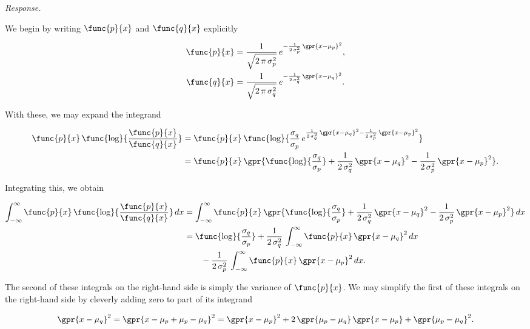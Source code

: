 \textit{Response.}

We begin by writing $\func{p}{x}$ and $\func{q}{x}$ explicitly

\begin{subequations}
	\begin{align}
		\func{p}{x} &= \frac{1}{\sqrt{2\,\pi\,\sigma_p^2}}\,e^{-\frac{1}{2\,\sigma_p^2}\,\gpr{x - \mu_p}^2},\\
		\func{q}{x} &= \frac{1}{\sqrt{2\,\pi\,\sigma_q^2}}\,e^{-\frac{1}{2\,\sigma_q^2}\,\gpr{x - \mu_q}^2}.
	\end{align}
\end{subequations}

With these, we may expand the integrand

\begin{align}
	\func{p}{x}\,\func{\log}{\frac{\func{p}{x}}{\func{q}{x}}} &= \func{p}{x}\,\func{\log}{\frac{\sigma_q}{\sigma_p}\,e^{\frac{1}{2\,\sigma_q^2}\,\gpr{x - \mu_q}^2 - \frac{1}{2\,\sigma_p^2}\,\gpr{x - \mu_p}^2}} \nonumber \\
		&= \func{p}{x}\,\gpr{\func{\log}{\frac{\sigma_q}{\sigma_p}} + \frac{1}{2\,\sigma_q^2}\,\gpr{x - \mu_q}^2 - \frac{1}{2\,\sigma_p^2}\,\gpr{x - \mu_p}^2}.
\end{align}

Integrating this, we obtain

\begin{align}
	\int_{-\infty}^{\infty} \func{p}{x}\,\func{\log}{\frac{\func{p}{x}}{\func{q}{x}}}\,dx &= \int_{-\infty}^{\infty} \func{p}{x}\,\gpr{\func{\log}{\frac{\sigma_q}{\sigma_p}} + \frac{1}{2\,\sigma_q^2}\,\gpr{x - \mu_q}^2 - \frac{1}{2\,\sigma_p^2}\,\gpr{x - \mu_p}^2}\,dx \nonumber \\
		&= \func{\log}{\frac{\sigma_q}{\sigma_p}} + \frac{1}{2\,\sigma_q^2}\,\int_{-\infty}^{\infty} \func{p}{x}\,\gpr{x - \mu_q}^2\,dx \nonumber \\
			&\qquad - \frac{1}{2\,\sigma_p^2}\,\int_{-\infty}^{\infty} \func{p}{x}\,\gpr{x - \mu_p}^2\,dx.
\end{align}

The second of these integrals on the right-hand side is simply the variance of $\func{p}{x}$. We may simplify the first of these integrals on the right-hand side by cleverly adding zero to part of its integrand

\begin{equation}
	\gpr{x - \mu_q}^2 = \gpr{x - \mu_p + \mu_p - \mu_q}^2 = \gpr{x - \mu_p}^2 + 2\,\gpr{\mu_p - \mu_q}\,\gpr{x - \mu_p} + \gpr{\mu_p - \mu_q}^2.
\end{equation}


